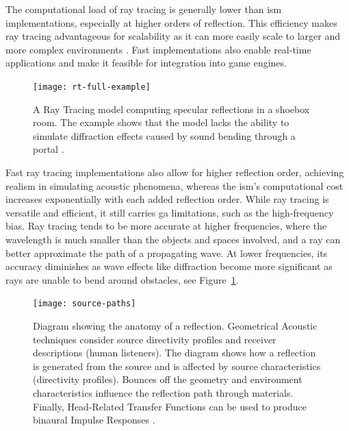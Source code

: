 The computational load of ray tracing is generally lower than \acrshort{ism} implementations, especially at higher orders of reflection. This efficiency makes ray tracing advantageous for scalability as it can more easily scale to larger and more complex environments \citep{schissler2014high}.
Fast implementations also enable real-time applications and make it feasible for integration into game engines.
\begin{figure}[htbp]
    \centering
    \texttt{[image: rt-full-example]}
    \caption[Ray Tracing, shoebox room demonstration]{A Ray Tracing model computing specular reflections in a shoebox room. The example shows that the model lacks the ability to simulate diffraction effects caused by sound bending through a portal \citep{funkhouser:inria-00606737}.}\label{fig:ray-tracing-diagram3}
\end{figure}
Fast ray tracing implementations also allow for higher reflection order, achieving realism in simulating acoustic phenomena, whereas the \acrshort{ism}'s computational cost increases exponentially with each added reflection order.
While ray tracing is versatile and efficient, it still carries \acrshort{ga} limitations, such as the high-frequency bias. Ray tracing tends to be more accurate at higher frequencies, where the wavelength is much smaller than the objects and spaces involved, and a ray can better approximate the path of a propagating wave. At lower frequencies, its accuracy diminishes as wave effects like diffraction become more significant as rays are unable to bend around obstacles, see Figure~\ref{fig:ray-tracing-diagram3}.

\begin{figure}[htbp]
    \centering
    \texttt{[image: source-paths]}
    \caption[Geometrical Acoustic source paths visualisation]{Diagram showing the anatomy of a reflection. Geometrical Acoustic techniques consider source directivity profiles and receiver descriptions (human listeners). The diagram shows how a reflection is generated from the source and is affected by source characteristics (directivity profiles). Bounces off the geometry and environment characteristics influence the reflection path through materials. Finally, Head-Related Transfer Functions can be used to produce binaural Impulse Responses \citep{schroder2011physically}.}\label{fig:ga-source-paths}
\end{figure}


